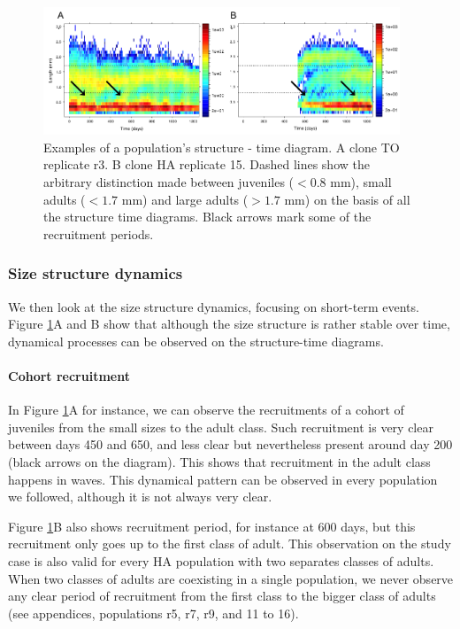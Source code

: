 \begin{figure}[!ht]
\begin{center}
\includegraphics[width=0.95\textwidth]{3-1_ChapExp1/Fig/AnnSP1}
\caption[Examples of a population's
structure]{Examples of a population's structure - time diagram. A clone TO
replicate r3. B clone HA replicate 15. Dashed lines show the arbitrary
distinction made between juveniles ($<0.8$ mm), small adults ($<1.7$ mm) and
large adults ($>1.7$ mm) on the basis of all the structure time diagrams. Black
arrows mark some of the recruitment periods.}
\label{fig:AnSP1}
\end{center}
\end{figure}

\subsubsection{Size structure dynamics}

 We then look at the size structure dynamics, focusing on short-term events.
Figure \ref{fig:AnSP1}A and B show that although the size structure is rather
stable over time, dynamical processes can be observed on the structure-time
diagrams.

\paragraph{Cohort recruitment}

In Figure \ref{fig:AnSP1}A for instance, we can observe the recruitments of a cohort of
juveniles from the small sizes to the adult class. Such recruitment is very
clear between days 450 and 650, and less clear but nevertheless present around
day 200 (black arrows on the diagram). This shows that recruitment in the adult
class happens in waves. This dynamical pattern can be observed in every
population we followed, although it is not always very clear.

Figure \ref{fig:AnSP1}B also shows recruitment period, for instance at 600 days, but this
recruitment only goes up to the first class of adult. This observation on the
study case is also valid for every HA population with two separates classes of
adults. When two classes of adults are coexisting in a single population, we
never observe any clear period of recruitment from the first class to the bigger
class of adults (see appendices, populations r5, r7, r9, and 11 to 16).

